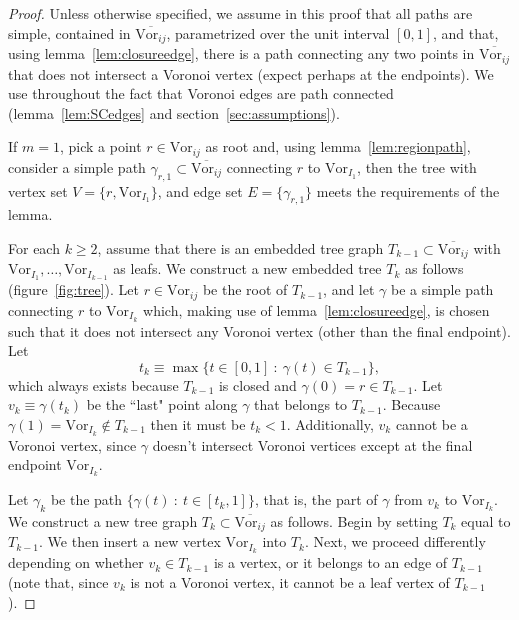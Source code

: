 \documentclass[11pt]{article}
\newcommand{\Vor}{\text{Vor}}
\begin{document}
\begin{proof}

Unless otherwise specified, we assume in this proof that all paths are simple, contained in $\overline{\Vor_{ij}}$, 
	parametrized over the unit interval $[0,1]$, 
	and that, using lemma~\ref{lem:closureedge},
	there is a path connecting any two points in $\overline{\Vor_{ij}}$ that does not intersect a Voronoi vertex
	(expect perhaps at the endpoints). 
We use throughout the fact that Voronoi edges are path connected (lemma~\ref{lem:SCedges} and section~\ref{sec:assumptions}). 



If $m=1$, pick a point $r\in\Vor_{ij}$ as root and, 
	using lemma~\ref{lem:regionpath},
	 consider a simple path $\gamma_{r,1}\subset\overline{\Vor_{ij}}$ connecting $r$ to $\Vor_{I_1}$, 
	then the tree with vertex set $V=\{r,\Vor_{I_1}\}$, and edge set $E=\{\gamma_{r,1}\}$ meets the requirements of the lemma. 





For each $k\ge 2$, assume that there is an embedded tree graph $T_{k-1}\subset\overline{\Vor_{ij}}$ 
	with $\Vor_{I_1},\dots,\Vor_{I_{k-1}}$ as leafs. 
We construct a new embedded tree $T_k$ as follows (figure~\ref{fig:tree}). Let $r\in\Vor_{ij}$ be the root of $T_{k-1}$, 
	and let $\gamma$ be a simple path connecting $r$ to $\Vor_{I_k}$ which, 
	making use of lemma~\ref{lem:closureedge}, is chosen such that it does not intersect 
	any Voronoi vertex (other than the final endpoint). 
Let 
	\[ t_k \equiv \max \{t\in [0,1] ~:~ \gamma(t)\in T_{k-1} \}, \]
	which always exists because $T_{k-1}$ is closed 
	and $\gamma(0)=r\in T_{k-1}$. 
Let $v_k\equiv \gamma(t_k)$ be the ``last" point along $\gamma$ that belongs to $T_{k-1}$.
Because $\gamma(1)=\Vor_{I_k}\notin T_{k-1}$ 
	then it must be $t_k <1$. 
Additionally, $v_k$ cannot be a Voronoi vertex, 
	since $\gamma$ doesn't intersect Voronoi vertices except at the final endpoint $\Vor_{I_k}$. 



Let $\gamma_k$ be the path $\{\gamma(t) ~:~ t\in [t_k,1]\}$, 
	that is, the part of $\gamma$ from $v_k$ to $\Vor_{I_k}$. 
We construct a new tree graph $T_k\subset\overline{\Vor_{ij}}$ as follows. 
Begin by setting $T_k$ equal to $T_{k-1}$. 
We then insert a new vertex $\Vor_{I_k}$ into $T_k$. 
Next, we proceed differently depending on whether $v_k\in T_{k-1}$ 
	is a vertex, or it belongs to an edge of $T_{k-1}$
(note that, since $v_k$ is not a Voronoi vertex, it cannot be a leaf vertex of $T_{k-1}$). 





\end{proof}
\end{document}
